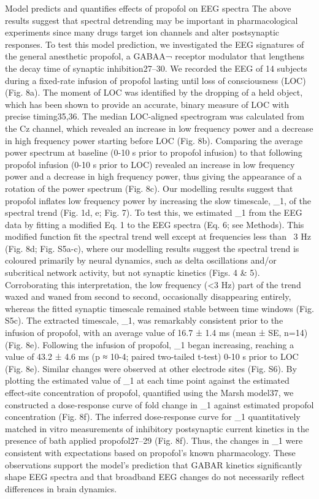 Model predicts and quantifies effects of propofol on EEG spectra
The above results suggest that spectral detrending may be important in pharmacological experiments since many drugs target ion channels and alter postsynaptic responses. To test this model prediction, we investigated the EEG signatures of the general anesthetic propofol, a GABAA¬ receptor modulator that lengthens the decay time of synaptic inhibition27–30. We recorded the EEG of 14 subjects during a fixed-rate infusion of propofol lasting until loss of consciousness (LOC) (Fig. 8a). The moment of LOC was identified by the dropping of a held object, which has been shown to provide an accurate, binary measure of LOC with precise timing35,36. The median LOC-aligned spectrogram was calculated from the Cz channel, which revealed an increase in low frequency power and a decrease in high frequency power starting before LOC (Fig. 8b). Comparing the average power spectrum at baseline (0-10 s prior to propofol infusion) to that following propofol infusion (0-10 s prior to LOC) revealed an increase in low frequency power and a decrease in high frequency power, thus giving the appearance of a rotation of the power spectrum (Fig. 8c). 
Our modelling results suggest that propofol inflates low frequency power by increasing the slow timescale, \tau_1, of the spectral trend (Fig. 1d, e; Fig. 7). To test this, we estimated \tau_1 from the EEG data by fitting a modified Eq. 1 to the EEG spectra (Eq. 6; see Methods). This modified function fit the spectral trend well except at frequencies less than ~3 Hz (Fig. 8d; Fig. S5a-c), where our modelling results suggest the spectral trend is coloured primarily by neural dynamics, such as delta oscillations and/or subcritical network activity, but not synaptic kinetics (Figs. 4 & 5). Corroborating this interpretation, the low frequency (<3 Hz) part of the trend waxed and waned from second to second, occasionally disappearing entirely, whereas the fitted synaptic timescale remained stable between time windows (Fig. S5c). The extracted timescale, \tau_1, was remarkably consistent prior to the infusion of propofol, with an average value of 16.7 ± 1.4 ms (mean ± SE, n=14) (Fig. 8e). Following the infusion of propofol, \tau_1 began increasing, reaching a value of 43.2 ± 4.6 ms (p ≈ 10-4; paired two-tailed t-test) 0-10 s prior to LOC (Fig. 8e). Similar changes were observed at other electrode sites (Fig. S6). By plotting the estimated value of \tau_1 at each time point against the estimated effect-site concentration of propofol, quantified using the Marsh model37, we constructed a dose-response curve of fold change in \tau_1 against estimated propofol concentration (Fig. 8f). The inferred dose-response curve for \tau_1 quantitatively matched in vitro measurements of inhibitory postsynaptic current kinetics in the presence of bath applied propofol27–29 (Fig. 8f). Thus, the changes in \tau_1 were consistent with expectations based on propofol’s known pharmacology. These observations support the model’s prediction that GABAR kinetics significantly shape EEG spectra and that broadband EEG changes do not necessarily reflect differences in brain dynamics. 

